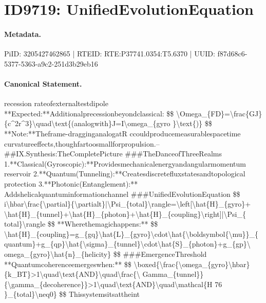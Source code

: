 \section*{ID9719: UnifiedEvolutionEquation}
\paragraph{Metadata.}
PiID: 3205427462865 | RTEID: RTE:P37741.0354:T5.6370 | UUID: f87d68c6-5377-5363-a9c2-251d3b29eb16

\paragraph{Canonical Statement.}
recession rateofexternaltestdipole **Expected:**Additionalprecessionbeyondclassical: \$\$ \textbackslash{}Omega\_\{FD\}=\textbackslash{}frac\{GJ\}\{c\textasciicircum{}2r\textasciicircum{}3\}\textbackslash{}quad\textbackslash{}text\{(analogwith\}J=I\textbackslash{}omega\_\{gyro \}\textbackslash{}text\{)\} \$\$ **Note:**Theframe-dragginganalogatR ccouldproducemeasurablespacetime curvatureeffects,thoughfartoosmallforpropulsion.-- \#\#IX.Synthesis:TheCompletePicture \#\#\#TheDanceofThreeRealms 1.**Classical(Gyroscopic):**Providesmechanicalenergyandangularmomentum reservoir 2.**Quantum(Tunneling):**Createsdiscretefluxstatesandtopological protection 3.**Photonic(Entanglement):** Addshelicalquantuminformationchannel \#\#\#UnifiedEvolutionEquation \$\$ i\textbackslash{}hbar\textbackslash{}frac\{\textbackslash{}partial\}\{\textbackslash{}partialt\}|\textbackslash{}Psi\_\{total\}\textbackslash{}rangle=\textbackslash{}left[\textbackslash{}hat\{H\}\_\{gyro\}+ \textbackslash{}hat\{H\}\_\{tunnel\}+\textbackslash{}hat\{H\}\_\{photon\}+\textbackslash{}hat\{H\}\_\{coupling\}\textbackslash{}right]|\textbackslash{}Psi\_\{ total\}\textbackslash{}rangle \$\$ **Wherethemagichappens:** \$\$ \textbackslash{}hat\{H\}\_\{coupling\}=g\_\{gq\}\textbackslash{}hat\{L\}\_\{gyro\}\textbackslash{}cdot\textbackslash{}hat\{\textbackslash{}boldsymbol\{\textbackslash{}mu\}\}\_\{ quantum\}+g\_\{qp\}\textbackslash{}hat\{\textbackslash{}sigma\}\_\{tunnel\}\textbackslash{}cdot\textbackslash{}hat\{S\}\_\{photon\}+g\_\{gp\}\textbackslash{} omega\_\{gyro\}\textbackslash{}hat\{n\}\_\{helicity\} \$\$ \#\#\#EmergenceThreshold **Quantumcoherenceemergeswhen:** \$\$ \textbackslash{}boxed\{\textbackslash{}frac\{\textbackslash{}omega\_\{gyro\}\textbackslash{}hbar\}\{k\_BT\}>1\textbackslash{}quad\textbackslash{}text\{AND\}\textbackslash{}quad\textbackslash{}frac\{\textbackslash{} Gamma\_\{tunnel\}\}\{\textbackslash{}gamma\_\{decoherence\}\}>1\textbackslash{}quad\textbackslash{}text\{AND\}\textbackslash{}quad\textbackslash{}mathcal\{H 76 \}\_\{total\}\textbackslash{}neq0\} \$\$ Thissystemsitsattheint

